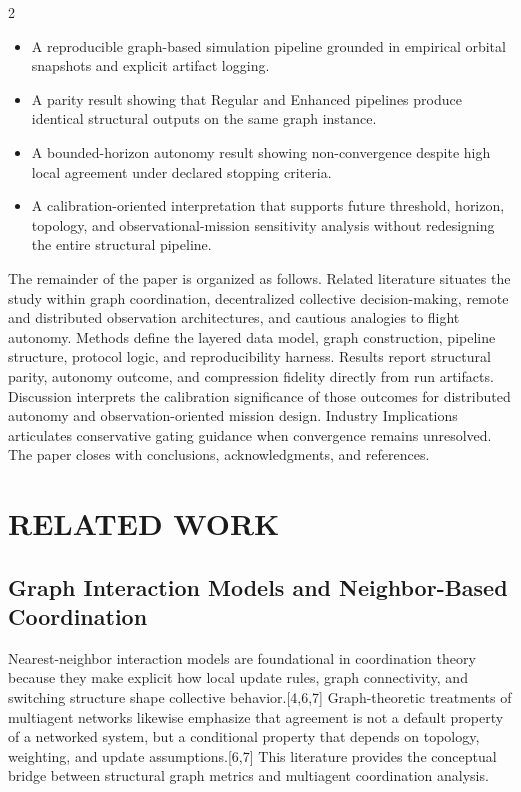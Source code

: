 \documentclass[fleqn,10pt,letterpaper]{article}
\begin{document}
\begin{multicols}{2}
\begin{itemize}
\item A reproducible graph-based simulation pipeline grounded in empirical orbital snapshots and explicit artifact logging.
\item A parity result showing that Regular and Enhanced pipelines produce identical structural outputs on the same graph instance.
\item A bounded-horizon autonomy result showing non-convergence despite high local agreement under declared stopping criteria.
\item A calibration-oriented interpretation that supports future threshold, horizon, topology, and observational-mission sensitivity analysis without redesigning the entire structural pipeline.
\end{itemize}
The remainder of the paper is organized as follows. Related literature situates the study within graph coordination, decentralized collective decision-making, remote and distributed observation architectures, and cautious analogies to flight autonomy. Methods define the layered data model, graph construction, pipeline structure, protocol logic, and reproducibility harness. Results report structural parity, autonomy outcome, and compression fidelity directly from run artifacts. Discussion interprets the calibration significance of those outcomes for distributed autonomy and observation-oriented mission design. Industry Implications articulates conservative gating guidance when convergence remains unresolved. The paper closes with conclusions, acknowledgments, and references.


\section{RELATED WORK}


\subsection{Graph Interaction Models and Neighbor-Based Coordination}

Nearest-neighbor interaction models are foundational in coordination theory because they make explicit how local update rules, graph connectivity, and switching structure shape collective behavior.[4,6,7] Graph-theoretic treatments of multiagent networks likewise emphasize that agreement is not a default property of a networked system, but a conditional property that depends on topology, weighting, and update assumptions.[6,7] This literature provides the conceptual bridge between structural graph metrics and multiagent coordination analysis.


\end{multicols}
\end{document}
